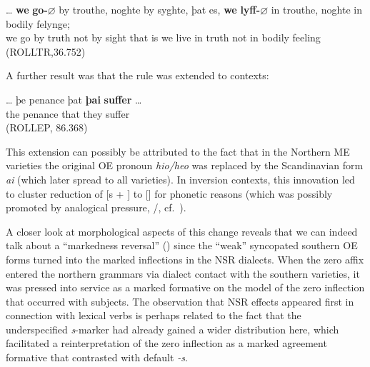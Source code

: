 \documentclass[output=paper]{langsci/langscibook}
\begin{document}
\ea
\gll \ldots{} \textbf{we} \textbf{go{-$\varnothing$}} by trouthe, noghte by syghte, þat es, \textbf{we} \textbf{lyff{-$\varnothing$}} in trouthe, noghte in bodily felynge;\\
{} we go by truth not by sight that is we live in truth not in bodily feeling\\
\glt (ROLLTR,36.752)
\z

\noindent
A further result was that the rule was extended to \Tpl{} contexts:

\ea
\gll \ldots{}  þe   penance    þat    \textbf{þai} \textbf{suffer} \ldots{}\\
{} the  penance  that  they  suffer {}\\
\glt (ROLLEP, 86.368)

\z

This extension can possibly be attributed to the fact that in the Northern ME
varieties the original \gls{OE} \Tpl{} pronoun \emph{hio/heo} was replaced by the
Scandinavian form \emph{\dh{}ai} (which later spread to all varieties). In
inversion contexts, this innovation led to cluster reduction of [s + \dh{}] to
[\dh{}] for phonetic reasons (which was possibly promoted by analogical
pressure, \Fpl{}/\Spl{}, cf.\ \citealt[56]{Pietsch:2005a}).

A closer look at morphological aspects of this change reveals that we can
indeed talk about a ``markedness reversal'' (\citealt{Pietsch:2005a}) since the
``weak'' syncopated southern \gls{OE} forms turned into the marked inflections in
the \gls{NSR} dialects. When the zero affix entered the northern grammars via
dialect contact with the southern varieties, it was pressed into service as a
marked  formative on the model of the zero inflection that occurred
with \Fsg{} subjects.  The observation that \gls{NSR} effects appeared first in
connection with lexical verbs is perhaps related to the fact that the
underspecified \emph{s}-marker had already gained a wider distribution here,
which facilitated a reinterpretation of the zero inflection as a marked
agreement formative that contrasted with default \emph{-s}.
\end{document}
